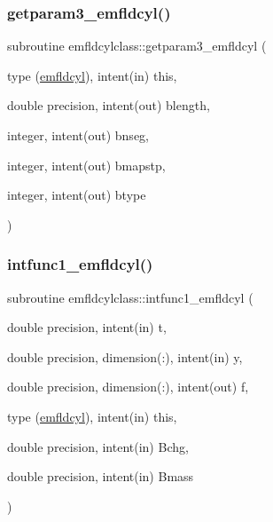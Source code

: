 \mbox{\label{namespaceemfldcylclass_adf4df0b6ae1ec53f13894e1bdfe962ae}} 
\subsubsection{\texorpdfstring{getparam3\_emfldcyl()}{getparam3\_emfldcyl()}}
{\footnotesize\ttfamily subroutine emfldcylclass\+::getparam3\+\_\+emfldcyl (\begin{DoxyParamCaption}\item[{type (\mbox{\hyperlink{namespaceemfldcylclass_structemfldcylclass_1_1emfldcyl}{emfldcyl}}), intent(in)}]{this,  }\item[{double precision, intent(out)}]{blength,  }\item[{integer, intent(out)}]{bnseg,  }\item[{integer, intent(out)}]{bmapstp,  }\item[{integer, intent(out)}]{btype }\end{DoxyParamCaption})}

\mbox{\label{namespaceemfldcylclass_ae4610622d1f42f54717c97aab5324391}} 
\subsubsection{\texorpdfstring{intfunc1\_emfldcyl()}{intfunc1\_emfldcyl()}}
{\footnotesize\ttfamily subroutine emfldcylclass\+::intfunc1\+\_\+emfldcyl (\begin{DoxyParamCaption}\item[{double precision, intent(in)}]{t,  }\item[{double precision, dimension(\+:), intent(in)}]{y,  }\item[{double precision, dimension(\+:), intent(out)}]{f,  }\item[{type (\mbox{\hyperlink{namespaceemfldcylclass_structemfldcylclass_1_1emfldcyl}{emfldcyl}}), intent(in)}]{this,  }\item[{double precision, intent(in)}]{Bchg,  }\item[{double precision, intent(in)}]{Bmass }\end{DoxyParamCaption})}

